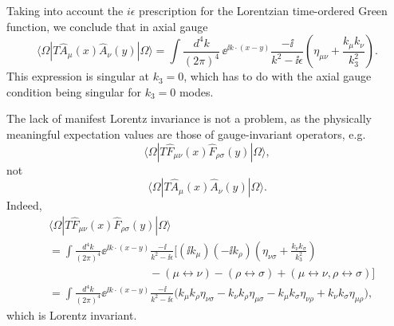 Taking into account the \(i\epsilon\) prescription for the Lorentzian
time-ordered Green function, we conclude that in axial gauge
\[
  \langle\Omega|T\widehat A_\mu(x)\widehat A_\nu(y)|\Omega\rangle
  =
  \int\frac{d^4k}{(2\pi)^4}\,
  \ee^{\ii k\cdot(x-y)}
  \frac{-\ii}{k^2-\ii\epsilon}
  \left(
    \eta_{\mu\nu}+\frac{k_\mu k_\nu}{k_3^2}
  \right).
\]
This expression is singular at \(k_3=0\), which has to do with the axial
gauge condition being singular for \(k_3=0\) modes.

The lack of manifest Lorentz invariance is not a problem, as the physically
meaningful expectation values are those of gauge-invariant operators, e.g.
\[
  \langle\Omega|
  T\widehat F_{\mu\nu}(x)\widehat F_{\rho\sigma}(y)
  |\Omega\rangle,
\]
not
\[
  \langle\Omega|
  T\widehat A_\mu(x)\widehat A_\nu(y)
  |\Omega\rangle.
\]
Indeed,
\[
\begin{aligned}
  &\langle\Omega|
  T\widehat F_{\mu\nu}(x)\widehat F_{\rho\sigma}(y)
  |\Omega\rangle
\\
  &=
  \int\frac{d^4k}{(2\pi)^4}
  \ee^{\ii k\cdot(x-y)}
  \frac{-\ii}{k^2-\ii\epsilon}
  \Biggl[
    (\ii k_\mu)(-\ii k_\rho)
    \left(\eta_{\nu\sigma}+\frac{k_\nu k_\sigma}{k_3^2}\right)
\\
  &\hspace{9em}
    -(\mu\leftrightarrow\nu)
    -(\rho\leftrightarrow\sigma)
    +(\mu\leftrightarrow\nu,\rho\leftrightarrow\sigma)
  \Biggr]
\\
  &=
  \int\frac{d^4k}{(2\pi)^4}
  \ee^{\ii k\cdot(x-y)}
  \frac{-\ii}{k^2-\ii\epsilon}
  \bigl(
    k_\mu k_\rho\eta_{\nu\sigma}
    -k_\nu k_\rho\eta_{\mu\sigma}
    -k_\mu k_\sigma\eta_{\nu\rho}
    +k_\nu k_\sigma\eta_{\mu\rho}
  \bigr),
\end{aligned}
\]
which is Lorentz invariant.

